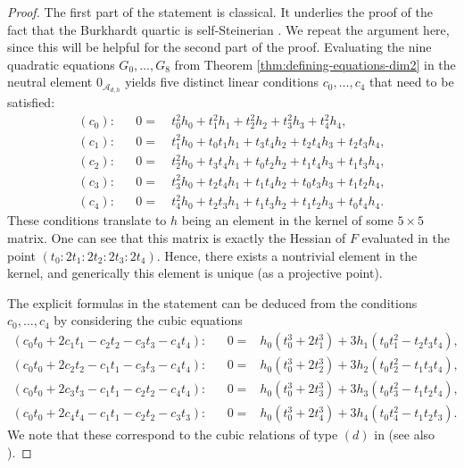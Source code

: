 \documentclass[11pt]{amsart}
\theoremstyle{definition}
\newcommand{\A}{\mathcal{A}}
\begin{document}
\begin{proof}
    The first part of the statement is classical. It underlies the proof of the fact that the Burkhardt quartic is self-Steinerian \cite[Section 5.3.1]{hunt2006burkhardt}. We repeat the argument here, since this will be helpful for the second part of the proof.
    Evaluating the nine quadratic equations $G_0,\ldots,G_8$ from Theorem \ref{thm:defining-equations-dim2} in the neutral element $0_{\A_{d,h}}$ yields five distinct linear conditions $c_0, \dots, c_4$  that need to be satisfied:
    \begin{align*}
    (c_0): && 0 = &~ t_{0}^{2} h_{0} + t_{1}^{2} h_{1} + t_{2}^{2} h_{2} + t_{3}^{2} h_{3} + t_{4}^{2} h_{4}, \\
    (c_1): && 0 = &~t_{1}^{2} h_{0} + t_{0} t_{1} h_{1} + t_{3} t_{4} h_{2} + t_{2} t_{4} h_{3} + t_{2} t_{3} h_{4},\\
    (c_2): && 0 = &~ t_{2}^{2} h_{0} + t_{3} t_{4} h_{1} + t_{0} t_{2} h_{2} + t_{1} t_{4} h_{3} + t_{1} t_{3} h_{4}, \\  
    (c_3): && 0= &~ t_{3}^{2} h_{0} + t_{2} t_{4} h_{1} + t_{1} t_{4} h_{2} + t_{0} t_{3} h_{3} + t_{1} t_{2} h_{4}, \\  
    (c_4): && 0 = &~t_{4}^{2} h_{0} + t_{2} t_{3} h_{1} + t_{1} t_{3} h_{2} + t_{1} t_{2} h_{3} + t_{0} t_{4} h_{4}.
    \end{align*}
    These conditions translate to $h$ being an element in the kernel of some $5 \times 5$ matrix. One can see that this matrix is exactly the Hessian of $F$ evaluated in the point $(t_0:2t_1:2t_2:2t_3:2t_4)$. Hence, there exists a nontrivial element in the kernel, and generically this element is unique (as a projective point). 

    The explicit formulas in the statement can be deduced from the conditions $c_0, \dots, c_4$ by considering the cubic equations
    \begin{align*}
        (c_0t_0 + 2c_1t_1 - c_2t_2-c_3t_3-c_4t_4): && 0 =& h_0 (t_0^3 + 2 t_1^3) + 3 h_1 (t_0t_1^2 - t_2t_3t_4),\\
        (c_0t_0 + 2c_2t_2 - c_1t_1-c_3t_3-c_4t_4): && 0 =& h_0 (t_0^3 + 2 t_2^3) + 3 h_2 (t_0t_2^2 - t_1t_3t_4),\\
        (c_0t_0 + 2c_3t_3 - c_1t_1-c_2t_2-c_4t_4): && 0 =& h_0 (t_0^3 + 2 t_3^3) + 3 h_3 (t_0t_3^2 - t_1t_2t_4),\\
        (c_0t_0 + 2c_4t_4 - c_1t_1-c_2t_2-c_3t_3): && 0 =& h_0 (t_0^3 + 2 t_4^3) + 3 h_4 (t_0t_4^2 - t_1t_2t_3).
    \end{align*}
    We note that these correspond to the cubic relations of type $(d)$ in \cite[Theorem 4.1]{gunji2006defining} (see also \cite[Section 8]{gunji2006defining}).
\end{proof}
\end{document}
